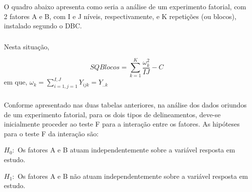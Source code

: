 \documentclass[14pt,aspectratio=1610]{beamer}
\begin{document}
\begin{frame}{}
\frametitle{}
\begin{block}{}
\justifying
O quadro abaixo apresenta como seria a análise de um experimento
fatorial, com 2 fatores A e B, com I e J níveis, respectivamente, e K repetições
(ou blocos), instalado segundo o DBC.
\end{block}
\pause
\begin{block}{}
\begin{table}[!h]
\end{table}
\end{block}
\end{frame}

\begin{frame}{}
\frametitle{}
\begin{block}{}
\justifying
Nesta situação,

$$SQBlocos={\displaystyle \sum_{k=1}^{K}\dfrac{\omega_{k}^{2}}{IJ}-C}$$
em que, $\omega_{k}={\displaystyle \sum_{i=1,j=1}^{I,J}Y_{ijk}=Y_{..k}}$

\end{block}
\end{frame}

\begin{frame}{}
\frametitle{}
\begin{block}{}
\justifying
Conforme apresentado nas duas tabelas anteriores, na análise dos dados
oriundos de um experimento fatorial, para os dois tipos de delineamentos,
deve-se inicialmente proceder ao teste F para a interação entre os fatores. As
hipóteses para o teste F da interação são:
\end{block}
\pause
\begin{block}{}
\justifying
$H_{0}:$ Os fatores A e B atuam independentemente sobre a variável
resposta em estudo.

$H_{1}:$ Os fatores A e B não atuam independentemente sobre a variável
resposta em estudo.

\end{block}
\end{frame}
\end{document}
